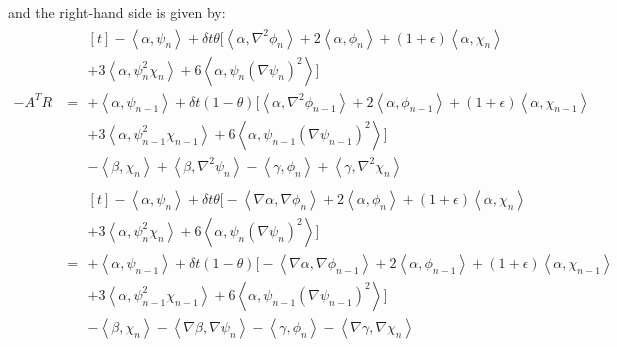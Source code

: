 \documentclass[reqno]{article}
\begin{document}
and the right-hand side is given by:
\begin{equation}
    \begin{split}
        -A^T R
        &=
        \begin{multlined}[t]
            -\left<\alpha, \psi_n \right>
            + \delta t \theta \bigl[
                \left<\alpha, \nabla^2 \phi_n \right> 
                + 2 \left< \alpha, \phi_n \right>  
                + \left(1 + \epsilon\right) \left< \alpha, \chi_n \right> \\
                + 3 \left< \alpha, \psi_n^2 \chi_n \right>
                + 6 \left< \alpha, \psi_n \left(\nabla \psi_n \right)^2 \right>
                \bigr] \\
            + \left< \alpha, \psi_{n - 1} \right>
            + \delta t \left(1 - \theta \right) \bigl[
                \left<\alpha, \nabla^2 \phi_{n - 1} \right>
                + 2 \left< \alpha, \phi_{n - 1} \right> 
                + \left(1 + \epsilon\right) \left<\alpha, \chi_{n - 1} \right> \\
                + 3 \left< \alpha, \psi_{n - 1}^2 \chi_{n - 1} \right> 
                + 6 \left< \alpha, \psi_{n - 1} \left(\nabla \psi_{n - 1}\right)^2 \right>
            \bigr] \\
            - \left<\beta, \chi_n \right>
            + \left<\beta, \nabla^2 \psi_n\right>
            - \left< \gamma, \phi_n \right>
            + \left< \gamma, \nabla^2 \chi_n \right>
        \end{multlined} \\
        &=
        \begin{multlined}[t]
            -\left<\alpha, \psi_n \right>
            + \delta t \theta \bigl[
                -\left<\nabla\alpha, \nabla \phi_n \right> 
                + 2 \left< \alpha, \phi_n \right>  
                + \left(1 + \epsilon\right) \left< \alpha, \chi_n \right> \\
                + 3 \left< \alpha, \psi_n^2 \chi_n \right>
                + 6 \left< \alpha, \psi_n \left(\nabla \psi_n \right)^2 \right>
                \bigr] \\
            + \left< \alpha, \psi_{n - 1} \right>
            + \delta t \left(1 - \theta \right) \bigl[
                -\left<\nabla \alpha, \nabla \phi_{n - 1} \right>
                + 2 \left< \alpha, \phi_{n - 1} \right> 
                + \left(1 + \epsilon\right) \left<\alpha, \chi_{n - 1} \right> \\
                + 3 \left< \alpha, \psi_{n - 1}^2 \chi_{n - 1} \right> 
                + 6 \left< \alpha, \psi_{n - 1} \left(\nabla \psi_{n - 1}\right)^2 \right>
            \bigr] \\
            - \left<\beta, \chi_n \right>
            - \left<\nabla\beta, \nabla \psi_n\right>
            - \left< \gamma, \phi_n \right>
            - \left< \nabla\gamma, \nabla \chi_n \right>
        \end{multlined}
    \end{split}
\end{equation}
\end{document}
